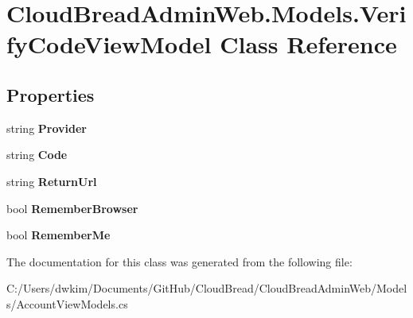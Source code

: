 \hypertarget{class_cloud_bread_admin_web_1_1_models_1_1_verify_code_view_model}{}\section{Cloud\+Bread\+Admin\+Web.\+Models.\+Verify\+Code\+View\+Model Class Reference}
\label{class_cloud_bread_admin_web_1_1_models_1_1_verify_code_view_model}
\subsection*{Properties}
\begin{DoxyCompactItemize}
\item 
string {\bfseries Provider}\hypertarget{class_cloud_bread_admin_web_1_1_models_1_1_verify_code_view_model_a482c4ecbfdeee70f5bbe4cba40761124}{}\label{class_cloud_bread_admin_web_1_1_models_1_1_verify_code_view_model_a482c4ecbfdeee70f5bbe4cba40761124}

\item 
string {\bfseries Code}\hypertarget{class_cloud_bread_admin_web_1_1_models_1_1_verify_code_view_model_a94b556595a385a7c8b157631b6fe725f}{}\label{class_cloud_bread_admin_web_1_1_models_1_1_verify_code_view_model_a94b556595a385a7c8b157631b6fe725f}

\item 
string {\bfseries Return\+Url}\hypertarget{class_cloud_bread_admin_web_1_1_models_1_1_verify_code_view_model_a6d21943b62168f105ae0a6831410e5d8}{}\label{class_cloud_bread_admin_web_1_1_models_1_1_verify_code_view_model_a6d21943b62168f105ae0a6831410e5d8}

\item 
bool {\bfseries Remember\+Browser}\hypertarget{class_cloud_bread_admin_web_1_1_models_1_1_verify_code_view_model_a5a1831eb77112abc072cc06b6bcee35a}{}\label{class_cloud_bread_admin_web_1_1_models_1_1_verify_code_view_model_a5a1831eb77112abc072cc06b6bcee35a}

\item 
bool {\bfseries Remember\+Me}\hypertarget{class_cloud_bread_admin_web_1_1_models_1_1_verify_code_view_model_a336d6fbeedd08dd5f3d31eeca854c1ce}{}\label{class_cloud_bread_admin_web_1_1_models_1_1_verify_code_view_model_a336d6fbeedd08dd5f3d31eeca854c1ce}

\end{DoxyCompactItemize}


The documentation for this class was generated from the following file\+:\begin{DoxyCompactItemize}
\item 
C\+:/\+Users/dwkim/\+Documents/\+Git\+Hub/\+Cloud\+Bread/\+Cloud\+Bread\+Admin\+Web/\+Models/Account\+View\+Models.\+cs\end{DoxyCompactItemize}
